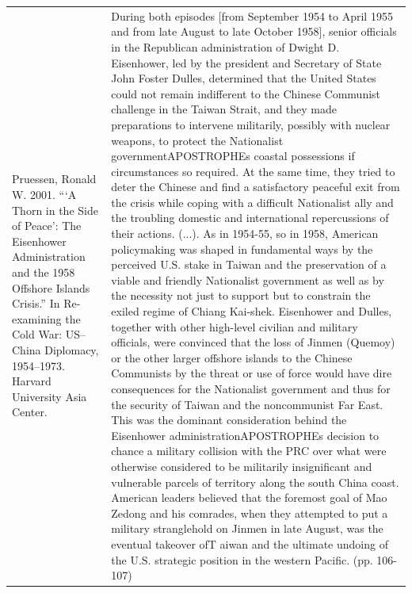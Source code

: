 {\begin{longtable}{p{}p{}}
Pruessen, Ronald W. 2001. “‘A Thorn in the Side of Peace’: The Eisenhower Administration and the 1958 Offshore Islands Crisis.” In Re-examining the Cold War: US–China Diplomacy, 1954–1973. Harvard University Asia Center. & During both episodes [from September 1954 to April 1955 and from late August to late October 1958], senior officials in the Republican administration of Dwight D. Eisenhower, led by the president and Secretary of State John Foster Dulles, determined that the United States could not remain indifferent to the Chinese Communist challenge in the Taiwan Strait, and they made preparations to intervene militarily, possibly with nuclear weapons, to protect the Nationalist governmentAPOSTROPHEs coastal possessions if circumstances so required. At the same time, they tried to deter the Chinese and find a satisfactory peaceful exit from the crisis while coping with a difficult Nationalist ally and the troubling domestic and international repercussions of their actions. (...). As in 1954-55, so in 1958, American policymaking was shaped in fundamental ways by the perceived U.S. stake in Taiwan and the preservation of a viable and friendly Nationalist government as well as by the necessity not just to support but to constrain the exiled regime of Chiang Kai-shek. Eisenhower and Dulles, together with other high-level civilian and military officials, were convinced that the loss of Jinmen (Quemoy) or the other larger offshore islands to the Chinese Communists by the threat or use of force would have dire consequences for the Nationalist government and thus for the security of Taiwan and the noncommunist Far East. This was the dominant consideration behind the Eisenhower administrationAPOSTROPHEs decision to chance a military collision with the PRC over what were otherwise considered to be militarily insignificant and vulnerable parcels of territory along the south China coast. American leaders believed that the foremost goal of Mao Zedong and his comrades, when they attempted to put a military stranglehold on Jinmen in late August, was the eventual takeover ofT aiwan and the ultimate undoing of the U.S. strategic position in the western Pacific. (pp. 106-107)
\\

\end{longtable}}
